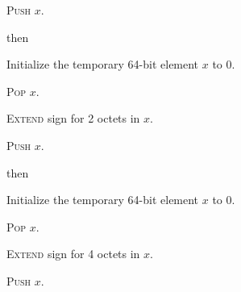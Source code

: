 \documentclass[a4paper,12pt]{article}
\newcommand{\num}[1]{\texttt{#1}}
\newcommand{\hex}[1]{\num{#1}_{\textup{\tiny 16}}}
\newcommand{\proc}[1]{\textsc{#1}}
\newcommand{\op}[1]{$#1$}
\newcommand{\SIGXS}     [1]{\op{\hex{0D}}}
\newcommand{\SIGXI}     [1]{\op{\hex{0E}}}
\begin{document}
\begin{stepnumbers}[start=3]
\begin{description}
\begin{stepnumbers}
    \item \proc{Push} $x$.
    \end{stepnumbers}
  \item[\SIGXS{}] then
    \begin{stepnumbers}
    \item Initialize the temporary 64-bit element $x$ to 0.
    \item \proc{Pop} $x$.
    \item \proc{Extend} sign for 2 octets in $x$.
    \item \proc{Push} $x$.
    \end{stepnumbers}
  \item[\SIGXI{}] then
    \begin{stepnumbers}
    \item Initialize the temporary 64-bit element $x$ to 0.
    \item \proc{Pop} $x$.
    \item \proc{Extend} sign for 4 octets in $x$.
    \item \proc{Push} $x$.
    \end{stepnumbers}
  \end{description}
\end{stepnumbers}
\end{document}
